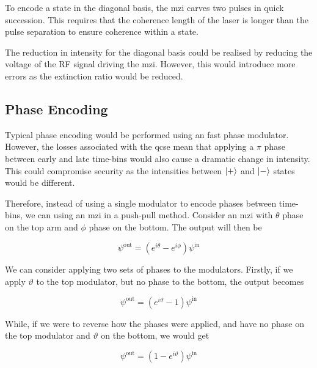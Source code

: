 
To encode a state in the diagonal basis, the \ac{mzi} carves two pulses in quick succession. This requires that the coherence length of the laser is longer than the pulse separation to ensure coherence within a state. 

The reduction in intensity for the diagonal basis could be realised by reducing the voltage of the RF signal driving the \ac{mzi}. However, this would introduce more errors as the extinction ratio would be reduced.

\subsection{Phase Encoding}

Typical phase encoding would be performed using an fast phase modulator. However, the losses associated with the \ac{qcse} mean that applying a $\pi$ phase between early and late time-bins would also cause a dramatic change in intensity. This could compromise security as the intensities between $\ket{+}$ and $\ket{-}$ states would be different. 

Therefore, instead of using a single modulator to encode phases between time-bins, we can using an \ac{mzi} in a push-pull method. Consider an \ac{mzi} with $\theta$ phase on the top arm and $\phi$ phase on the bottom. The output will then be 

\begin{equation}
	\psi^\mathrm{out} =  \left(e^{i\theta} - e^{i\phi}\right) \psi^\mathrm{in}
\end{equation}

We can consider applying two sets of phases to the modulators. Firstly, if we apply $\vartheta$ to the top modulator, but no phase to the bottom, the output becomes

\begin{equation}
	\psi^\mathrm{out} =  \left(e^{i\vartheta} -1\right) \psi^\mathrm{in}
\end{equation}

While, if we were to reverse how the phases were applied, and have no phase on the top modulator and $\vartheta$ on the bottom, we would get

\begin{equation}
	\psi^\mathrm{out} =  \left(1 - e^{i\vartheta}\right) \psi^\mathrm{in}
\end{equation}

